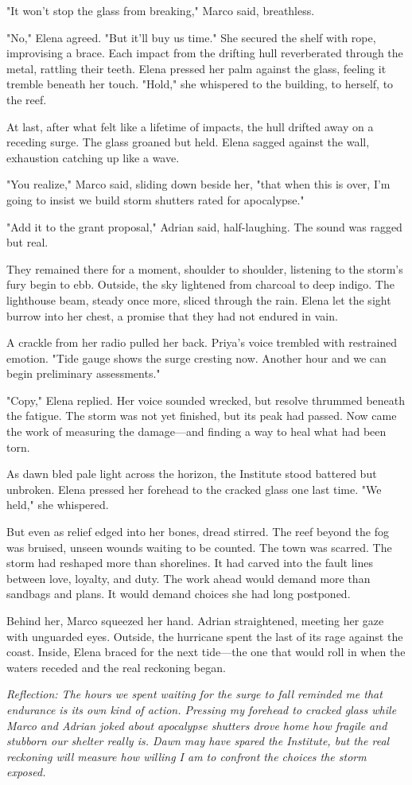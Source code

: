 "It won't stop the glass from breaking," Marco said, breathless.

"No," Elena agreed. "But it'll buy us time." She secured the shelf with rope, improvising a brace. Each impact from the drifting hull reverberated through the metal, rattling their teeth. Elena pressed her palm against the glass, feeling it tremble beneath her touch. "Hold," she whispered to the building, to herself, to the reef.

At last, after what felt like a lifetime of impacts, the hull drifted away on a receding surge. The glass groaned but held. Elena sagged against the wall, exhaustion catching up like a wave.

"You realize," Marco said, sliding down beside her, "that when this is over, I'm going to insist we build storm shutters rated for apocalypse."

"Add it to the grant proposal," Adrian said, half-laughing. The sound was ragged but real.

They remained there for a moment, shoulder to shoulder, listening to the storm's fury begin to ebb. Outside, the sky lightened from charcoal to deep indigo. The lighthouse beam, steady once more, sliced through the rain. Elena let the sight burrow into her chest, a promise that they had not endured in vain.

A crackle from her radio pulled her back. Priya's voice trembled with restrained emotion. "Tide gauge shows the surge cresting now. Another hour and we can begin preliminary assessments."

"Copy," Elena replied. Her voice sounded wrecked, but resolve thrummed beneath the fatigue. The storm was not yet finished, but its peak had passed. Now came the work of measuring the damage—and finding a way to heal what had been torn.

As dawn bled pale light across the horizon, the Institute stood battered but unbroken. Elena pressed her forehead to the cracked glass one last time. "We held," she whispered.

But even as relief edged into her bones, dread stirred. The reef beyond the fog was bruised, unseen wounds waiting to be counted. The town was scarred. The storm had reshaped more than shorelines. It had carved into the fault lines between love, loyalty, and duty. The work ahead would demand more than sandbags and plans. It would demand choices she had long postponed.

Behind her, Marco squeezed her hand. Adrian straightened, meeting her gaze with unguarded eyes. Outside, the hurricane spent the last of its rage against the coast. Inside, Elena braced for the next tide—the one that would roll in when the waters receded and the real reckoning began.

\noindent\textit{Reflection: The hours we spent waiting for the surge to fall reminded me that endurance is its own kind of action. Pressing my forehead to cracked glass while Marco and Adrian joked about apocalypse shutters drove home how fragile and stubborn our shelter really is. Dawn may have spared the Institute, but the real reckoning will measure how willing I am to confront the choices the storm exposed.}
